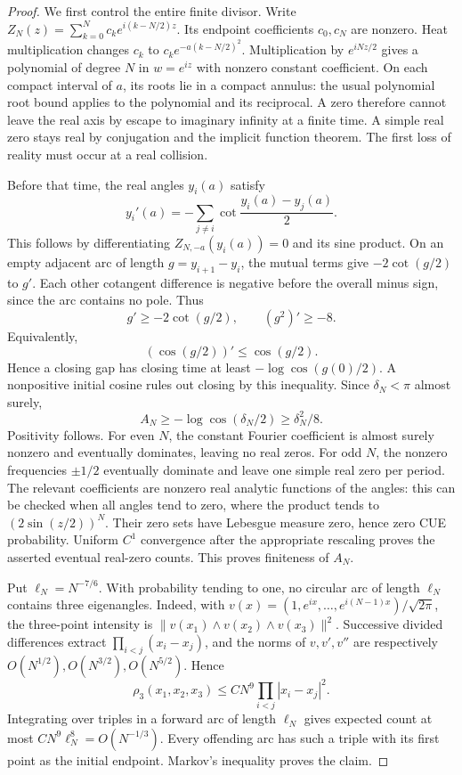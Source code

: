 \begin{proof}
We first control the entire finite divisor. Write
$Z_N(z)=\sum_{k=0}^Nc_ke^{i(k-N/2)z}$. Its endpoint coefficients $c_0,c_N$ are nonzero. Heat multiplication changes $c_k$ to $c_ke^{-a(k-N/2)^2}$. Multiplication by $e^{iNz/2}$ gives a polynomial of degree $N$ in $w=e^{iz}$ with nonzero constant coefficient. On each compact interval of $a$, its roots lie in a compact annulus: the usual polynomial root bound applies to the polynomial and its reciprocal. A zero therefore cannot leave the real axis by escape to imaginary infinity at a finite time. A simple real zero stays real by conjugation and the implicit function theorem. The first loss of reality must occur at a real collision.

Before that time, the real angles $y_i(a)$ satisfy
\[
 y_i'(a)=-\sum_{j\ne i}\cot\frac{y_i(a)-y_j(a)}2.
\]
This follows by differentiating $Z_{N,-a}(y_i(a))=0$ and its sine product. On an empty adjacent arc of length $g=y_{i+1}-y_i$, the mutual terms give $-2\cot(g/2)$ to $g'$. Each other cotangent difference is negative before the overall minus sign, since the arc contains no pole. Thus
\[
          g'\ge-2\cot(g/2),\qquad (g^2)'\ge-8.
\]
Equivalently,
\[
                  (\cos(g/2))'\le\cos(g/2).
\]
Hence a closing gap has closing time at least $-\log\cos(g(0)/2)$.
A nonpositive initial cosine rules out closing by this inequality.
Since $\delta_N<\pi$ almost surely,
\[
                   A_N\ge-\log\cos(\delta_N/2)\ge\delta_N^2/8.
\]
Positivity follows. For even $N$, the constant Fourier coefficient is almost surely nonzero and eventually dominates, leaving no real zeros. For odd $N$, the nonzero frequencies $\pm1/2$ eventually dominate and leave one simple real zero per period. The relevant coefficients are nonzero real analytic functions of the angles: this can be checked when all angles tend to zero, where the product tends to $(2\sin(z/2))^N$. Their zero sets have Lebesgue measure zero, hence zero CUE probability. Uniform $C^1$ convergence after the appropriate rescaling proves the asserted eventual real-zero counts. This proves finiteness of $A_N$.

Put $\ell_N=N^{-7/6}$. With probability tending to one, no circular arc of length $\ell_N$ contains three eigenangles. Indeed, with
$v(x)=(1,e^{ix},\ldots,e^{i(N-1)x})/\sqrt{2\pi}$, the three-point intensity is
$\|v(x_1)\wedge v(x_2)\wedge v(x_3)\|^2$.
Successive divided differences extract $\prod_{i<j}(x_i-x_j)$, and the norms of $v,v',v''$ are respectively $O(N^{1/2}),O(N^{3/2}),O(N^{5/2})$. Hence
\[
 \rho_3(x_1,x_2,x_3)\le CN^9\prod_{i<j}|x_i-x_j|^2.
\]
Integrating over triples in a forward arc of length $\ell_N$ gives expected count at most $CN^9\ell_N^8=O(N^{-1/3})$. Every offending arc has such a triple with its first point as the initial endpoint. Markov's inequality proves the claim.


\end{proof}
